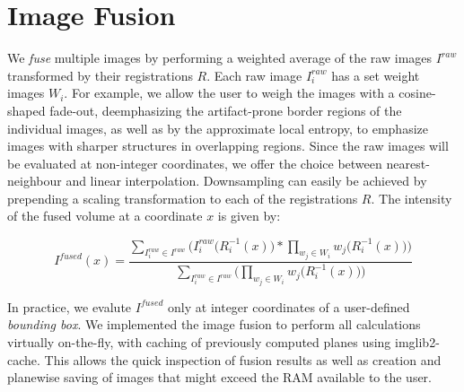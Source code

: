 \section{Image Fusion}
\label{sec:fusion}

We \emph{fuse} multiple images by performing a weighted average of the raw images $I^{raw}$ transformed by their registrations $R$. Each raw image $I^{raw}_i$ has a set weight images $W_i$. For example, we allow the user to weigh the images with a cosine-shaped fade-out, deemphasizing the artifact-prone border regions of the individual images, as well as by the approximate local entropy, to emphasize images with sharper structures in overlapping regions. Since the raw images will be evaluated at non-integer coordinates, we offer the choice between nearest-neighbour and linear interpolation. Downsampling can easily be achieved by prepending a scaling transformation to each of the registrations $R$. The intensity of the fused volume at a coordinate $x$ is given by:

\begin{equation}
\label{eq:fusion-eq1}
I^{fused}(x) ={ \frac{  \sum_{ I^{raw}_i \in I^{raw}} \Big(I^{raw}_i\big(R_i^{-1}(x)\big) * \prod_{w_j \in W_i}{w_j\big(R_i^{-1}(x)\big)\Big)}}{ \sum_{I^{raw}_i \in I^{raw}}\Big( \prod_{w_j \in W_i}{w_j\big(R_i^{-1}(x)\big)\Big)}}}
\end{equation}

In practice, we evalute $I^{fused}$ only at integer coordinates of a user-defined \emph{bounding box}. We implemented the image fusion to perform all calculations virtually on-the-fly, with caching of previously computed planes using imglib2-cache. This allows the quick inspection of fusion results as well as creation and planewise saving of images that might exceed the RAM available to the user.

